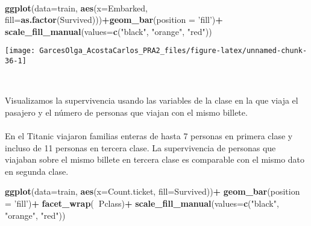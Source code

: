 \documentclass[
]{article}
\newenvironment{Shaded}{\begin{snugshade}}{\end{snugshade}}
\newcommand{\DataTypeTok}[1]{\textcolor[rgb]{0.13,0.29,0.53}{#1}}
\newcommand{\KeywordTok}[1]{\textcolor[rgb]{0.13,0.29,0.53}{\textbf{#1}}}
\newcommand{\NormalTok}[1]{#1}
\newcommand{\OperatorTok}[1]{\textcolor[rgb]{0.81,0.36,0.00}{\textbf{#1}}}
\newcommand{\StringTok}[1]{\textcolor[rgb]{0.31,0.60,0.02}{#1}}
\begin{document}
\texttt{}\\
\texttt{}

\begin{Shaded}
\begin{Highlighting}[]
\KeywordTok{ggplot}\NormalTok{(}\DataTypeTok{data=}\NormalTok{train, }\KeywordTok{aes}\NormalTok{(}\DataTypeTok{x=}\NormalTok{Embarked, }\DataTypeTok{fill=}\KeywordTok{as.factor}\NormalTok{(Survived)))}\OperatorTok{+}\KeywordTok{geom_bar}\NormalTok{(}\DataTypeTok{position =} \StringTok{'fill'}\NormalTok{)}\OperatorTok{+}
\StringTok{  }\KeywordTok{scale_fill_manual}\NormalTok{(}\DataTypeTok{values=}\KeywordTok{c}\NormalTok{(}\StringTok{"black"}\NormalTok{, }\StringTok{"orange"}\NormalTok{, }\StringTok{"red"}\NormalTok{))}
\end{Highlighting}
\end{Shaded}

\begin{center}\texttt{[image: GarcesOlga\_AcostaCarlos\_PRA2\_files/figure-latex/unnamed-chunk-36-1]} \end{center}

\texttt{}~\\
\texttt{}

Visualizamos la supervivencia usando las variables de la clase en la que
viaja el pasajero y el número de personas que viajan con el mismo
billete.\\
\texttt{}~\\
En el Titanic viajaron familias enteras de hasta 7 personas en primera
clase y incluso de 11 personas en tercera clase. La supervivencia de
personas que viajaban sobre el mismo billete en tercera clase es
comparable con el mismo dato en segunda clase.\\
\texttt{}

\begin{Shaded}
\begin{Highlighting}[]
\KeywordTok{ggplot}\NormalTok{(}\DataTypeTok{data=}\NormalTok{train, }\KeywordTok{aes}\NormalTok{(}\DataTypeTok{x=}\NormalTok{Count.ticket, }\DataTypeTok{fill=}\NormalTok{Survived))}\OperatorTok{+}
\StringTok{  }\KeywordTok{geom_bar}\NormalTok{(}\DataTypeTok{position =} \StringTok{'fill'}\NormalTok{)}\OperatorTok{+}
\StringTok{  }\KeywordTok{facet_wrap}\NormalTok{(}\OperatorTok{~}\NormalTok{Pclass)}\OperatorTok{+}
\StringTok{  }\KeywordTok{scale_fill_manual}\NormalTok{(}\DataTypeTok{values=}\KeywordTok{c}\NormalTok{(}\StringTok{"black"}\NormalTok{, }\StringTok{"orange"}\NormalTok{, }\StringTok{"red"}\NormalTok{))}
\end{Highlighting}
\end{Shaded}
\end{document}
